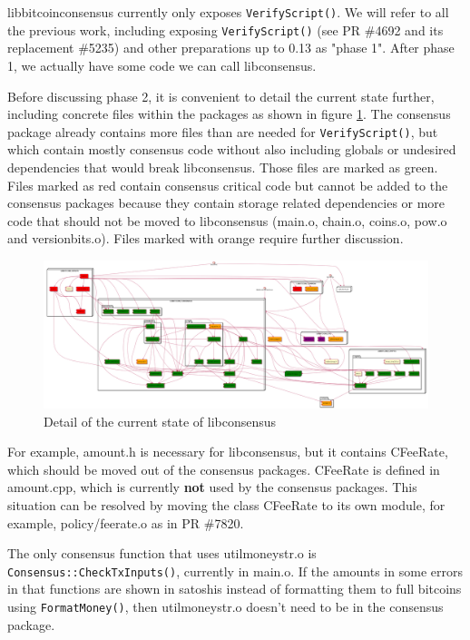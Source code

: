 \documentclass[11pt]{article}
\begin{document}
libbitcoinconsensus currently only exposes \texttt{VerifyScript()}. We will
refer to all the previous work, including exposing \texttt{VerifyScript()}
(see PR \#4692 and its replacement \#5235) and other preparations up to
0.13 as "phase 1". After phase 1, we actually have some code we can
call libconsensus.

Before discussing phase 2, it is convenient to detail the current
state further, including concrete files within the packages as shown
in figure \ref{pic_4_current_libconsensus}.
The consensus package already contains more files than are needed for
\texttt{VerifyScript()}, but which contain mostly consensus code without also
including globals or undesired dependencies that would break
libconsensus. Those files are marked as green. Files marked as red
contain consensus critical code but cannot be added to the consensus
packages because they contain storage related dependencies or more
code that should not be moved to libconsensus (main.o, chain.o,
coins.o, pow.o and versionbits.o). Files marked with orange require
further discussion.

\begin{figure}[htb]
\centering
\includegraphics[width=.9\linewidth]{./img/4_current_libconsensus.png}
\caption{\label{pic_4_current_libconsensus}Detail of the current state of libconsensus}
\end{figure}

For example, amount.h is necessary for libconsensus, but it contains
CFeeRate, which should be moved out of the consensus packages.
CFeeRate is defined in amount.cpp, which is currently \textbf{not} used by
the consensus packages. This situation can be resolved by moving the
class CFeeRate to its own module, for example, policy/feerate.o as in
PR \#7820.

The only consensus function that uses utilmoneystr.o is
\texttt{Consensus::CheckTxInputs()}, currently in main.o. If the amounts in
some errors in that functions are shown in satoshis instead of
formatting them to full bitcoins using \texttt{FormatMoney()}, then
utilmoneystr.o doesn't need to be in the consensus package.
\end{document}
